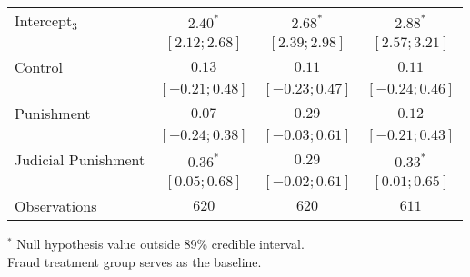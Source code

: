 \begin{table}[h]
\begin{center}
\begin{threeparttable}
\begin{tabular}{l c c c}
Intercept$_3$       & $2.40^{*}$        & $2.68^{*}$        & $2.88^{*}$        \\
                    & $ [ 2.12;  2.68]$ & $ [ 2.39;  2.98]$ & $ [ 2.57;  3.21]$ \\
Control             & $0.13$            & $0.11$            & $0.11$            \\
                    & $ [-0.21;  0.48]$ & $ [-0.23;  0.47]$ & $ [-0.24;  0.46]$ \\
Punishment          & $0.07$            & $0.29$            & $0.12$            \\
                    & $ [-0.24;  0.38]$ & $ [-0.03;  0.61]$ & $ [-0.21;  0.43]$ \\
Judicial Punishment & $0.36^{*}$        & $0.29$            & $0.33^{*}$        \\
                    & $ [ 0.05;  0.68]$ & $ [-0.02;  0.61]$ & $ [ 0.01;  0.65]$ \\
\hline
Observations        & $620$             & $620$             & $611$             \\
\hline
\end{tabular}
\begin{tablenotes}[flushleft]
\scriptsize{$^*$ Null hypothesis value outside 89\% credible interval.  \\
Fraud treatment group serves as the baseline.}
\end{tablenotes}
\end{threeparttable}
\label{table:coefficients}
\end{center}
\end{table}
